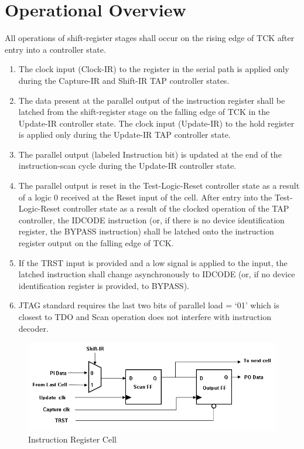 \newpage

\section{Operational Overview}
\label{sec:operation-instruction-reg}
All operations of shift-register stages shall occur on the rising edge of TCK after entry into a controller state.

\begin{enumerate}
    \item The clock input (Clock-IR) to the register in the serial path is applied only during the Capture-IR and Shift-IR TAP controller states.
    \item The data present at the parallel output of the instruction register shall be latched from the shift-register stage on the falling edge of TCK in the Update-IR controller state. The clock input (Update-IR) to the hold register is applied only during the Update-IR TAP controller state.
    \item The parallel output (labeled Instruction bit) is updated at the end of the \linebreak instruction-scan cycle during the Update-IR controller state.
    \item The parallel output is reset in the Test-Logic-Reset controller state as a result of a logic 0 received at the Reset input of the cell. After entry into the Test-Logic-Reset controller state as a result of the clocked operation of the TAP controller, the IDCODE instruction (or, if there is no device identification register, the BYPASS instruction) shall be latched onto the instruction register output on the falling edge of TCK.
    \item If the TRST input is provided and a low signal is applied to the input, the latched instruction shall change asynchronously to IDCODE (or, if no device identification register is provided, to BYPASS).
    \item JTAG standard requires the last two bits of parallel load = ‘01’ which is closest to TDO and Scan operation does not interfere with instruction decoder.
\end{enumerate}

\vspace{0.5cm}
\begin{figure}[H]
    \centering
    \includegraphics[width = 15cm]{images/instruction_register_cell.png}
    \vspace{1cm}
    \caption{Instruction Register Cell}
    \label{fig:instruction-reg-cell}
\end{figure}

